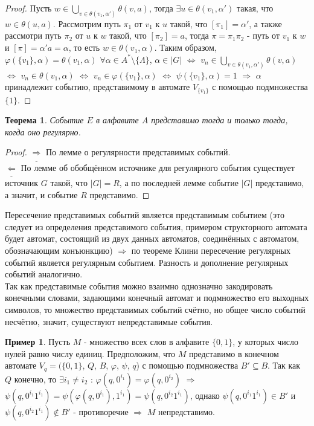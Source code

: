 \documentclass[a4paper, 12pt]{article}
\renewcommand{\phi}{\varphi}
\theoremstyle{definition}
\newtheorem*{example1}{Пример}
\theoremstyle{plain}
\newtheorem*{theorem}{Теорема}
\theoremstyle{remark}
\begin{document}
\begin{proof}
    Пусть $w\in\bigcup\limits_{v\in\theta(v_1,\alpha')}\theta(v,a)$, тогда $\exists u\in\theta(v_1,\alpha')$ такая, что $w\in\theta(u,a)$. Рассмотрим путь $\pi_1$ от $v_1$ к $u$ такой, что $[\pi_1]=\alpha'$, а также рассмотри путь $\pi_2$ от $u$ к $w$ такой, что $[\pi_2]=a$, тогда $\pi=\pi_1\pi_2$ - путь от $v_1$ к $w$ и $[\pi]=\alpha'a=\alpha$, то есть $w\in\theta(v_1,\alpha)$.
    Таким образом, $\phi(\{v_1\},\alpha)=\theta(v_1,\alpha)$ $\forall\alpha\in A^*\setminus\{\Lambda\}$, $\alpha\in|G|$ $\Leftrightarrow$ $v_n\in\bigcup\limits_{v\in\theta(v_1,\alpha')}\theta(v,a)$ $\Leftrightarrow$ $v_n\in\theta(v_1,\alpha)$ $\Leftrightarrow$ $v_n\in\phi(\{v_1\},\alpha)$ $\Leftrightarrow$ $\psi(\{v_1\},\alpha)=1$ $\Longrightarrow$ $\alpha$ принадлежит событию, представимому в автомате $V_{\{v_1\}}$ с помощью подмножества $\{1\}$.
  \end{proof}
  \begin{theorem}
    Событие $E$ в алфавите $A$ представимо тогда и только тогда, когда оно регулярно.
  \end{theorem}
  \begin{proof}
    $\underline{\Longrightarrow}$ По лемме о регулярности представимых событий.\\
    $\underline{\Longleftarrow}$ По лемме об обобщённом источнике для регулярного события существует источник $G$ такой, что $|G|=R$, а по последней лемме событие $|G|$ представимо, а значит, и событие $R$ представимо.
  \end{proof}
  Пересечение представимых событий является представимым событием (это следует из определения представимого события, примером структорного автомата будет автомат, состоящий из двух данных автоматов, соединённых с автоматом, обозначающим конъюнкцию) $\Longrightarrow$ по теореме Клини пересечение регулярных событий является регулярным событием. Разность и дополнение регулярных событий аналогично.\\
  Так как представимые события можно взаимно однозначно закодировать конечными словами, задающими конечный автомат и подмножество его выходных символов, то множество представимых событий счётно, но общее число событий несчётно, значит, существуют непредставимые события.\\
  \begin{example1}
    Пусть $M$ - множество всех слов в алфавите $\{0,1\}$, у которых число нулей равно числу единиц. Предположим, что $M$ представимо в конечном автомате $V_q=(\{0,1\}$, $Q$, $B$, $\phi$, $\psi$, $q$) с помощью подмножества $B'\subseteq B$. Так как $Q$ конечно, то $\exists i_1\neq i_2$ : $\phi(q,0^{i_1})=\phi(q,0^{i_2})$ $\Longrightarrow$ $\psi(q,0^{i_1}1^{i_1})=\psi(\phi(q,0^{i_1}),1^{i_1})=\psi(q,0^{i_2}1^{i_1})$, однако $\psi(q,0^{i_1}1^{i_1})\in B'$ и $\psi(q,0^{i_2}1^{i_1})\notin B'$ - противоречие $\Longrightarrow$ $M$ непредставимо.
  \end{example1}
\end{document}
